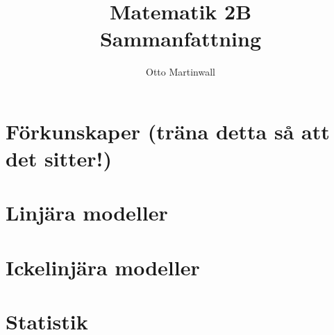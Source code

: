 
\usepackage[swedish]{babel}

\title{Matematik 2B \\ Sammanfattning}
\author{Otto Martinwall}


\maketitle
\tableofcontents
\newpage

\newtheorem{definition}{Definition}
\newtheorem{theorem}{Theorem}

\section{Förkunskaper (träna detta så att det sitter!)}


\section{Linjära modeller}


\section{Ickelinjära modeller}


\section{Statistik}


